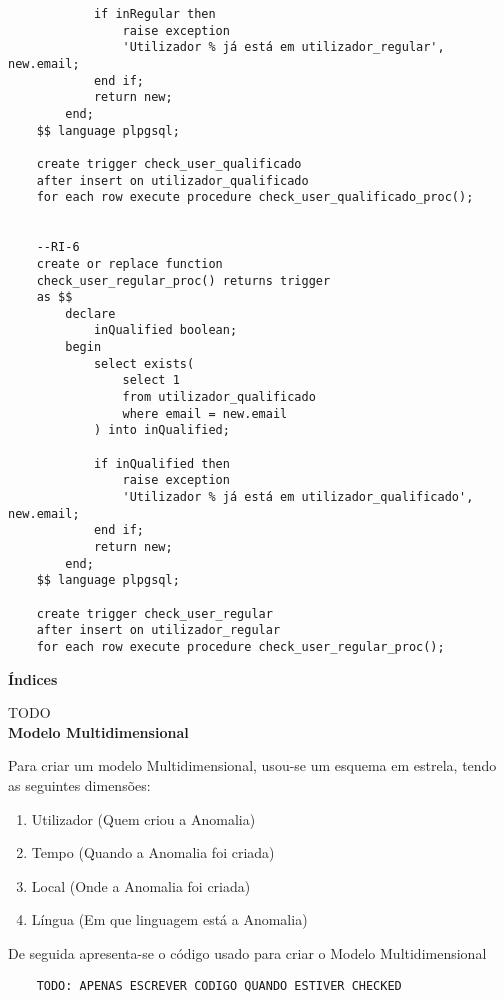 \documentclass[12pt]{report}
\begin{document}
\begin{verbatim}
            if inRegular then
                raise exception
                'Utilizador % já está em utilizador_regular', new.email;
            end if;
            return new;
        end;
    $$ language plpgsql;
    
    create trigger check_user_qualificado
    after insert on utilizador_qualificado
    for each row execute procedure check_user_qualificado_proc();
    
    
    --RI-6
    create or replace function
    check_user_regular_proc() returns trigger
    as $$
        declare
            inQualified boolean;
        begin
            select exists(
                select 1
                from utilizador_qualificado
                where email = new.email
            ) into inQualified;
            
            if inQualified then
                raise exception
                'Utilizador % já está em utilizador_qualificado', new.email;
            end if;
            return new;
        end;
    $$ language plpgsql;
    
    create trigger check_user_regular
    after insert on utilizador_regular
    for each row execute procedure check_user_regular_proc();
    \end{verbatim}
    \normalsize
    
    \Large
    \textbf{Índices}\\
    \normalsize
    \par TODO\\
    
    \Large
    \textbf{Modelo Multidimensional}\\
    \normalsize
    \par Para criar um modelo Multidimensional, usou-se um esquema em estrela, tendo as seguintes  dimensões:
    
    \begin{enumerate}[leftmargin=3\parindent]
        \item Utilizador (Quem criou a Anomalia)
        \item Tempo (Quando a Anomalia foi criada)
        \item Local (Onde a Anomalia foi criada)
        \item Língua (Em que linguagem está a Anomalia)
    \end{enumerate}

    \par De seguida apresenta-se o código usado para criar o Modelo Multidimensional
    \small \begin{verbatim}
    TODO: APENAS ESCREVER CODIGO QUANDO ESTIVER CHECKED
    \end{verbatim}\normalsize
    
\end{document}
